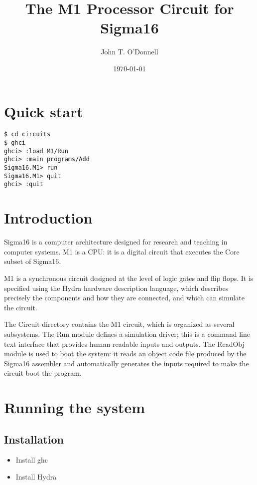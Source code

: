 \documentclass[11pt]{article}
\author{John T. O'Donnell}
\date{\today}
\title{The M1 Processor Circuit for Sigma16}
\begin{document}
\maketitle
\tableofcontents


\section{Quick start}
\label{sec:orgf4224c8}

\begin{verbatim}
$ cd circuits
$ ghci
ghci> :load M1/Run
ghci> :main programs/Add
Sigma16.M1> run
Sigma16.M1> quit
ghci> :quit
\end{verbatim}

\section{Introduction}
\label{sec:org123fdb7}

Sigma16 is a computer architecture designed for research and teaching
in computer systems.  M1 is a CPU: it is a digital circuit that
executes the Core subset of Sigma16.

M1 is a synchronous circuit designed at the level of logic gates and
flip flops.  It is specified using the Hydra hardware description
language, which describes precisely the components and how they are
connected, and which can simulate the circuit.

The Circuit directory contains the M1 circuit, which is organized as
several subsystems.  The Run module defines a simulation driver; this
is a command line text interface that provides human readable inputs
and outputs.  The ReadObj module is used to boot the system: it reads
an object code file produced by the Sigma16 assembler and
automatically generates the inputs required to make the circuit boot
the program.


\section{Running the system}
\label{sec:org4f15872}

\subsection{Installation}
\label{sec:org7ad5d3a}

\begin{itemize}
\item Install ghc
\item Install Hydra
\end{itemize}
\end{document}
